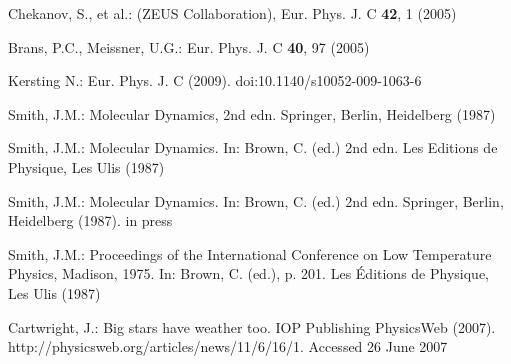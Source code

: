 \documentclass[fist]{svjour3}
\begin{document}
\begin{thebibliography}{9}

Chekanov, S., et al.: (ZEUS Collaboration), Eur. Phys. J. C \textbf{42}, 1 (2005)

Brans, P.C., Meissner, U.G.: Eur. Phys. J. C \textbf{40}, 97 (2005)

Kersting N.: Eur. Phys. J. C (2009). doi:10.1140/s10052-009-1063-6

Smith, J.M.: Molecular Dynamics, 2nd edn. Springer, Berlin, Heidelberg (1987)

Smith, J.M.: Molecular Dynamics. In: Brown, C. (ed.) 2nd edn. Les Editions de Physique, Les Ulis (1987)

Smith, J.M.: Molecular Dynamics. In: Brown, C. (ed.) 2nd edn. Springer, Berlin, Heidelberg (1987). in press

Smith, J.M.: Proceedings of the International
Conference on Low Temperature Physics, Madison,
1975. In: Brown, C. (ed.), p. 201. Les \'Editions de Physique, Les Ulis (1987)

Cartwright, J.: Big stars have weather too. IOP
Publishing PhysicsWeb (2007). http://physicsweb.org/articles/news/11/6/16/1. Accessed 26 June 2007

\end{thebibliography}
\end{document}

